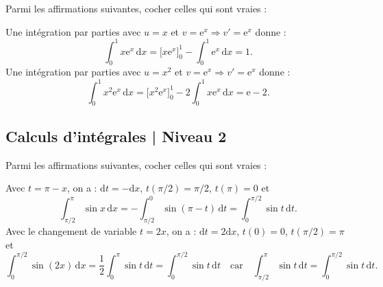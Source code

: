 \begin{question}
Parmi les affirmations suivantes, cocher celles qui sont vraies : 
\begin{answers}  
\end{answers}
\vskip2mm
\begin{explanations}
Une intégration par parties avec $u=x$ et $v=\mathrm{e}^x\Rightarrow v'=\mathrm{e}^x$ donne :
$$\int _0^1x\mathrm{e}^x\, \mathrm{d}x=\Big[x\mathrm{e}^x\Big]_0^1-\int _0^1\mathrm{e}^x\, \mathrm{d}x=1.$$
Une intégration par parties avec $u=x^2$ et $v=\mathrm{e}^x\Rightarrow v'=\mathrm{e}^x$ donne :
$$\int _0^1x^2\mathrm{e}^x\, \mathrm{d}x=\Big[x^2\mathrm{e}^x\Big]_0^1-2\int _0^1x\mathrm{e}^x\, \mathrm{d}x=\mathrm{e}-2.$$
\end{explanations}
\end{question}

\subsection{Calculs d'intégrales | Niveau 2}

\begin{question}
Parmi les affirmations suivantes, cocher celles qui sont vraies : 
\begin{answers}
\end{answers}
\begin{explanations}
Avec $t=\pi -x$, on a : $\mathrm{d}t=-\mathrm{d}x$, $t(\pi/2)=\pi/2$, $t(\pi)=0$ et 
$$\int _{\pi /2}^{\pi}\sin x\,\mathrm{d}x=-\int _{\pi /2}^0\sin (\pi-t)\,\mathrm{d}t=\int _0^{\pi /2}\sin t\,\mathrm{d}t.$$
Avec le changement de variable $t=2x$, on a : $\mathrm{d}t=2\mathrm{d}x$, $t(0)=0$, $t(\pi/2)=\pi$ et 
$$\int _0^{\pi /2}\sin (2x)\,\mathrm{d}x=\frac{1}{2}\int _0^{\pi }\sin t\,\mathrm{d}t=\int _0^{\pi /2}\sin t\,\mathrm{d}t\quad \mbox{car}\quad \int _{\pi /2}^{\pi}\sin t\,\mathrm{d}t=\int _0^{\pi /2}\sin t\,\mathrm{d}t.$$
\end{explanations}
\end{question}

